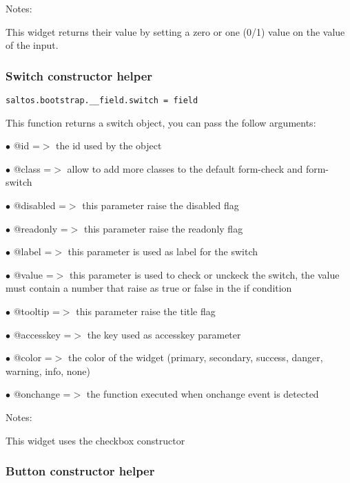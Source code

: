 \documentclass[a4paper]{article}
\begin{document}
Notes:

This widget returns their value by setting a zero or one (0/1) value on the value of the input.

\hypertarget{toc624}{}
\subsubsection{Switch constructor helper}

\begin{lstlisting}
saltos.bootstrap.__field.switch = field
\end{lstlisting}

This function returns a switch object, you can pass the follow arguments:

\begin{compactitem}
\item[\color{myblue}$\bullet$] @id        =$>$ the id used by the object
\item[\color{myblue}$\bullet$] @class     =$>$ allow to add more classes to the default form-check and form-switch
\item[\color{myblue}$\bullet$] @disabled  =$>$ this parameter raise the disabled flag
\item[\color{myblue}$\bullet$] @readonly  =$>$ this parameter raise the readonly flag
\item[\color{myblue}$\bullet$] @label     =$>$ this parameter is used as label for the switch
\item[\color{myblue}$\bullet$] @value     =$>$ this parameter is used to check or unckeck the switch, the value
              must contain a number that raise as true or false in the if condition
\item[\color{myblue}$\bullet$] @tooltip   =$>$ this parameter raise the title flag
\item[\color{myblue}$\bullet$] @accesskey =$>$ the key used as accesskey parameter
\item[\color{myblue}$\bullet$] @color     =$>$ the color of the widget (primary, secondary, success, danger, warning, info, none)
\item[\color{myblue}$\bullet$] @onchange  =$>$ the function executed when onchange event is detected
\end{compactitem}

Notes:

This widget uses the checkbox constructor

\hypertarget{toc625}{}
\subsubsection{Button constructor helper}
\end{document}
